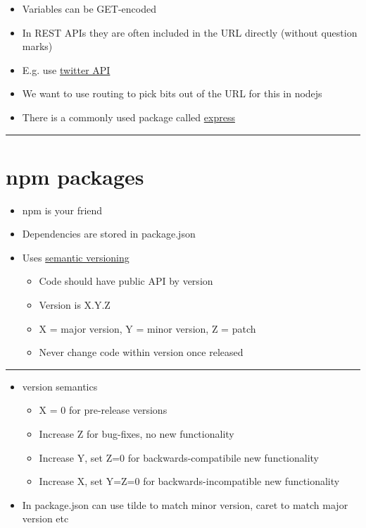 \documentclass{article}[18pt]
\providecommand{\tightlist}{%
	\setlength{\itemsep}{0pt}\setlength{\parskip}{0pt}}
\begin{document}
\begin{itemize}
	\tightlist
	\item
	Variables can be GET-encoded
	\item
	In REST APIs they are often included in the URL directly (without
	question marks)
	\item
	E.g. use
	\href{https://developer.twitter.com/en/docs/api-reference-index}{twitter
		API}
	\item
	We want to use routing to pick bits out of the URL for this in nodejs
	\item
	There is a commonly used package called
	\href{http://expressjs.com/}{express}
\end{itemize}

\begin{center}\rule{0.5\linewidth}{\linethickness}\end{center}

\hypertarget{npm-packages}{%
	\section{npm packages}\label{npm-packages}}

\begin{itemize}
	\tightlist
	\item
	npm is your friend
	\item
	Dependencies are stored in package.json
	\item
	Uses \href{http://semver.org}{semantic versioning}
	
	\begin{itemize}
		\tightlist
		\item
		Code should have public API by version
		\item
		Version is X.Y.Z
		\item
		X = major version, Y = minor version, Z = patch
		\item
		Never change code within version once released
	\end{itemize}
\end{itemize}

\begin{center}\rule{0.5\linewidth}{\linethickness}\end{center}

\begin{itemize}
	\tightlist
	\item
	version semantics
	
	\begin{itemize}
		\tightlist
		\item
		X = 0 for pre-release versions
		\item
		Increase Z for bug-fixes, no new functionality
		\item
		Increase Y, set Z=0 for backwards-compatibile new functionality
		\item
		Increase X, set Y=Z=0 for backwards-incompatible new functionality
	\end{itemize}
	\item
	In package.json can use tilde to match minor version, caret to match
	major version etc
\end{itemize}
\end{document}
